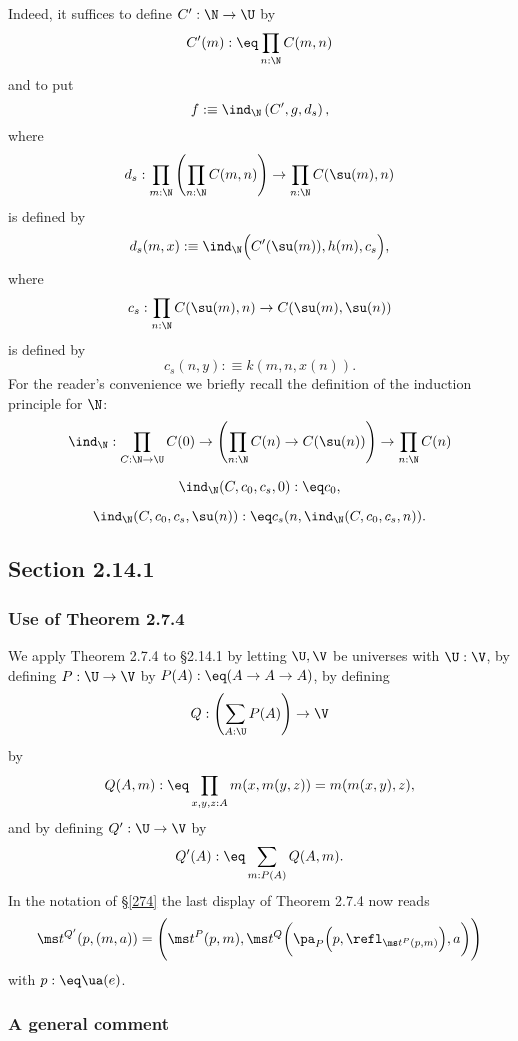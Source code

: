 \documentclass[12pt]{article}
\begin{document}
Indeed, it suffices to define $C':\N\to\U$ by 
$$
C'(m):\eq\prod_{n:\N}C(m,n)
$$ 
and to put 
$$
f:\equiv\ind_\N\left(C',g,d_s\right),
$$ 
where 
$$
d_s:\prod_{m:\N}\left(\prod_{n:\N}C(m,n)\right)\to\prod_{n:\N}C(\su(m),n)
$$ 
is defined by 
$$
d_s(m,x):\equiv\ind_\N\Big(C'(\su(m)),h(m),c_s\Big),
$$ 
where 
$$
c_s:\prod_{n:\N}C(\su(m),n)\to C(\su(m),\su(n))
$$ 
is defined by 
$$
c_s(n,y):\equiv k(m,n,x(n)).
$$ 
For the reader's convenience we briefly recall the definition of the induction principle for $\N$:
$$\ind_\N:\prod_{C:\N\to\U}C(0)\to\left(\prod_{n:\N}C(n)\to C(\su(n))\right)\to\prod_{n:\N} C(n)$$

$$\ind_\N(C,c_0,c_s,0):\eq c_0,$$

$$\ind_\N(C,c_0,c_s,\su(n)):\eq c_s(n,\ind_\N(C,c_0,c_s,n)).$$


\subsection{Section 2.14.1}

\subsubsection{Use of Theorem 2.7.4}

We apply Theorem 2.7.4 to \S2.14.1 by letting $\U,\V$ be universes with $\U:\V$, by defining $P:\U\to\V$ by $P(A):\eq(A\to A\to A)$, by defining 
$$
Q:\left(\sum_{A:\U}P(A)\right)\to\V
$$ 
by 
$$
Q(A,m):\eq\prod_{x,y,z:A}m(x,m(y,z))=m(m(x,y),z),
$$ 
and by defining $Q':\U\to\V$ by 
$$ 
Q'(A):\eq\sum_{m:P(A)}Q(A,m).
$$
In the notation of \S\ref{274} the last display of Theorem 2.7.4 now reads 
$$
\ms t^{Q'}(p,(m,a))=\Bigg(\ms t^P(p,m),\ms t^Q\bigg(\pa_P\Big(p,\refl_{\ms t^P(p,m)}\Big),a\bigg)\Bigg)
$$ 
with $p:\eq\ua(e)$.

\subsubsection{A general comment}
\end{document}
